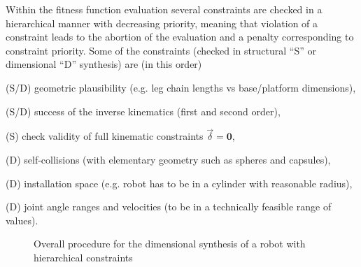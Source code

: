 \documentclass[
	graybox,
	vecphys] %
	{svmult}
\newcommand{\bm}[1]{\boldsymbol{#1}}
\newcommand{\Res}[0]{\vec{\delta}}
\begin{document}
Within the fitness function evaluation several constraints are checked in a hierarchical manner with decreasing priority, meaning that violation of a constraint leads to the abortion of the evaluation and a penalty corresponding to constraint priority.
Some of the constraints (checked in structural ``S'' or dimensional ``D'' synthesis) are (in this order)	
\begin{compactitem}
\item[(S/D)] geometric plausibility (e.g. leg chain lengths vs base/platform dimensions), 
\item[(S/D)] success of the inverse kinematics (first and second order), 
\item[(S)] check validity of full kinematic constraints $\Res{=}\bm{0}$,
\item[(D)] self-collisions (with elementary geometry such as spheres and capsules), 
\item[(D)] installation space (e.g. robot has to be in a cylinder with reasonable radius),
\item[(D)] joint angle ranges and velocities (to be in a technically feasible range of values).
\end{compactitem}



\begin{figure}[b!]
\vspace{-0.4cm} %
\centering

\caption{Overall procedure for the dimensional synthesis of a robot with hierarchical constraints}
\label{fig:flowchart_optimization}
\end{figure}

\pagebreak
\end{document}
